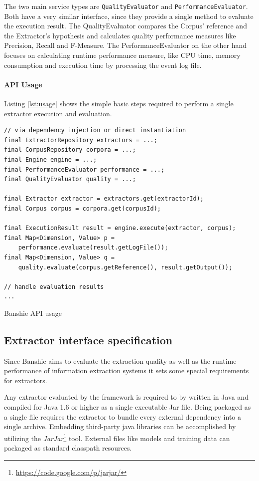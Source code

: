 The two main service types are \texttt{QualityEvaluator} and \texttt{PerformanceEvaluator}. Both have a very similar interface, since they provide a single method to evaluate the execution result. The QualityEvaluator compares the Corpus' reference and the Extractor's hypothesis and calculates quality performance measures like Precision, Recall and F-Measure. The PerformanceEvaluator on the other hand focuses on calculating runtime performance measure, like CPU time, memory consumption and execution time by processing the event log file.

\paragraph{API Usage}
Listing \ref{lst:usage} shows the simple basic steps required to perform a single extractor execution and evaluation.

\begin{listing}[H]
\begin{verbatim}
// via dependency injection or direct instantiation
final ExtractorRepository extractors = ...;
final CorpusRepository corpora = ...;
final Engine engine = ...;
final PerformanceEvaluator performance = ...;
final QualityEvaluator quality = ...;

final Extractor extractor = extractors.get(extractorId);
final Corpus corpus = corpora.get(corpusId);

final ExecutionResult result = engine.execute(extractor, corpus);
final Map<Dimension, Value> p = 
    performance.evaluate(result.getLogFile());
final Map<Dimension, Value> q = 
    quality.evaluate(corpus.getReference(), result.getOutput());

// handle evaluation results
...
\end{verbatim}
\caption{Banshie API usage}
\label{lst:usage}
\end{listing}

\subsection{Extractor interface specification}
\label{sec:extractor-specification}
Since Banshie aims to evaluate the extraction quality as well as the runtime performance of information extraction systems it sets some special requirements for extractors.

Any extractor evaluated by the framework is required to by written in Java and compiled for Java 1.6 or higher as a single executable Jar file. Being packaged as a single file requires the extractor to bundle every external dependency into a single archive. Embedding third-party java libraries can be accomplished by utilizing the \textit{JarJar}\footnote{\url{https://code.google.com/p/jarjar/}} tool. External files like models and training data can packaged as standard classpath resources.


